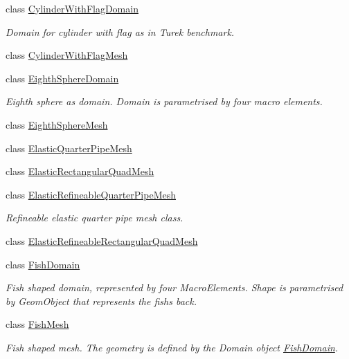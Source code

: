 \begin{DoxyCompactItemize}
class \hyperlink{classoomph_1_1CylinderWithFlagDomain}{Cylinder\+With\+Flag\+Domain}
\begin{DoxyCompactList}\small\item\em Domain for cylinder with flag as in Turek benchmark. \end{DoxyCompactList}\item 
class \hyperlink{classoomph_1_1CylinderWithFlagMesh}{Cylinder\+With\+Flag\+Mesh}
\item 
class \hyperlink{classoomph_1_1EighthSphereDomain}{Eighth\+Sphere\+Domain}
\begin{DoxyCompactList}\small\item\em Eighth sphere as domain. Domain is parametrised by four macro elements. \end{DoxyCompactList}\item 
class \hyperlink{classoomph_1_1EighthSphereMesh}{Eighth\+Sphere\+Mesh}
\item 
class \hyperlink{classoomph_1_1ElasticQuarterPipeMesh}{Elastic\+Quarter\+Pipe\+Mesh}
\item 
class \hyperlink{classoomph_1_1ElasticRectangularQuadMesh}{Elastic\+Rectangular\+Quad\+Mesh}
\item 
class \hyperlink{classoomph_1_1ElasticRefineableQuarterPipeMesh}{Elastic\+Refineable\+Quarter\+Pipe\+Mesh}
\begin{DoxyCompactList}\small\item\em Refineable elastic quarter pipe mesh class. \end{DoxyCompactList}\item 
class \hyperlink{classoomph_1_1ElasticRefineableRectangularQuadMesh}{Elastic\+Refineable\+Rectangular\+Quad\+Mesh}
\item 
class \hyperlink{classoomph_1_1FishDomain}{Fish\+Domain}
\begin{DoxyCompactList}\small\item\em Fish shaped domain, represented by four Macro\+Elements. Shape is parametrised by Geom\+Object that represents the fish\textquotesingle{}s back. \end{DoxyCompactList}\item 
class \hyperlink{classoomph_1_1FishMesh}{Fish\+Mesh}
\begin{DoxyCompactList}\small\item\em Fish shaped mesh. The geometry is defined by the Domain object \hyperlink{classoomph_1_1FishDomain}{Fish\+Domain}. \end{DoxyCompactList}\item 

\end{DoxyCompactItemize}
